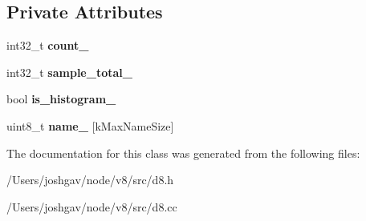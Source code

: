 \subsection*{Private Attributes}
\begin{DoxyCompactItemize}
\item 
int32\+\_\+t {\bfseries count\+\_\+}\hypertarget{classv8_1_1_counter_a5248bdaff844e1456e8a94dc8f700ba4}{}\label{classv8_1_1_counter_a5248bdaff844e1456e8a94dc8f700ba4}

\item 
int32\+\_\+t {\bfseries sample\+\_\+total\+\_\+}\hypertarget{classv8_1_1_counter_ae6ba47e1a54959836d065bd5fdce2803}{}\label{classv8_1_1_counter_ae6ba47e1a54959836d065bd5fdce2803}

\item 
bool {\bfseries is\+\_\+histogram\+\_\+}\hypertarget{classv8_1_1_counter_ad00a7c3f061e5e94171170e243fc5dcf}{}\label{classv8_1_1_counter_ad00a7c3f061e5e94171170e243fc5dcf}

\item 
uint8\+\_\+t {\bfseries name\+\_\+} \mbox{[}k\+Max\+Name\+Size\mbox{]}\hypertarget{classv8_1_1_counter_a4f4398d920b6eafea7f1350a2e43b312}{}\label{classv8_1_1_counter_a4f4398d920b6eafea7f1350a2e43b312}

\end{DoxyCompactItemize}


The documentation for this class was generated from the following files\+:\begin{DoxyCompactItemize}
\item 
/\+Users/joshgav/node/v8/src/d8.\+h\item 
/\+Users/joshgav/node/v8/src/d8.\+cc\end{DoxyCompactItemize}
